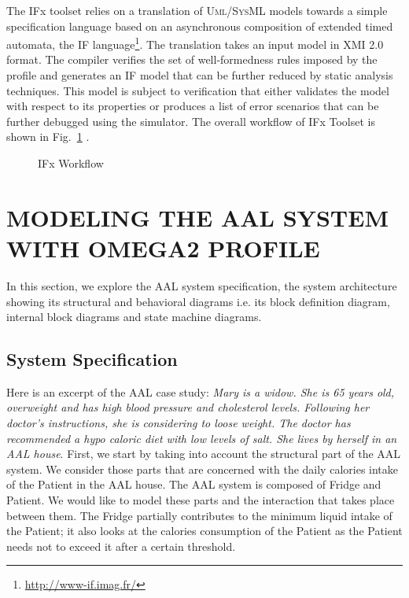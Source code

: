 \documentclass[a4paper,twoside]{article}
\def\sysml{\textsc{SysML}}
\def\uml{\textsc{Uml}}
\begin{document}
The IFx toolset relies on a translation of \uml{}/\sysml{} models towards a simple specification language based on an asynchronous composition of extended timed automata, the IF language\footnote{\url{http://www-if.imag.fr/}}. The translation takes an input model in XMI 2.0 format. 
The compiler verifies the set of well-formedness rules imposed by the profile and generates an IF model that can be further reduced by static analysis techniques. This model is subject to verification that either validates the model with respect to its properties or produces a list of error scenarios that can be further debugged using the simulator. The overall workflow  of IFx Toolset is shown in Fig.~\ref{fig:flow} \cite{test16}.

\begin{figure}[!htb]
  \centering
  {}
  \caption{IFx Workflow}
  \label{fig:flow}
\end{figure}
 


\section{\uppercase{Modeling the AAL system with OMEGA2 Profile}}
\label{sec:aal_model}
In this section, we explore the AAL system specification, the system architecture showing its structural and behavioral diagrams i.e. its block definition diagram, internal block diagrams and state machine diagrams.

\subsection{System Specification}
Here is an excerpt of the AAL case study\cite{test6}: \textit{Mary is a widow. She is 65 years old, overweight and has high blood pressure and cholesterol levels. Following her doctor’s instructions, she is considering to loose weight. The doctor has recommended a hypo caloric diet with low levels of salt. She lives by herself in an AAL house}.
First, we start by taking into account the structural part of the AAL system. We consider those parts that are concerned with the daily calories intake of the Patient in the AAL house. The AAL system is composed of Fridge and Patient. We would like to model these parts and the interaction that takes place between them. The Fridge partially contributes to the minimum liquid intake of the Patient; it also looks at the calories consumption of the Patient as the Patient needs not to exceed it after a certain threshold. 
\end{document}
